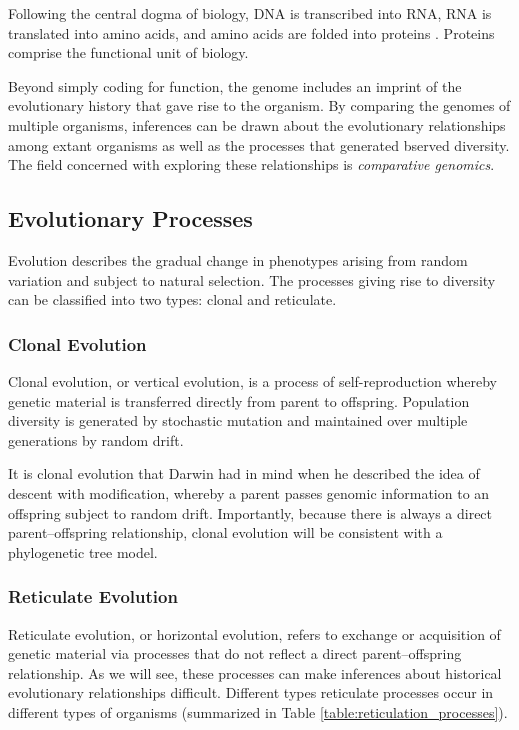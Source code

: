 Following the central dogma of biology, DNA is transcribed into RNA, RNA is translated into amino acids, and amino acids are folded into proteins \cite{Crick:1970wb}.
Proteins comprise the functional unit of biology.

Beyond simply coding for function, the genome includes an imprint of the evolutionary history that gave rise to the organism.
By comparing the genomes of multiple organisms, inferences can be drawn about the evolutionary relationships among extant organisms as well as the processes that generated bserved diversity.
The field concerned with exploring these relationships is \emph{comparative genomics}.

\subsection{Evolutionary Processes}
\label{bg:bio:evolution}

Evolution describes the gradual change in phenotypes arising from random variation and subject to natural selection.
The processes giving rise to diversity can be classified into two types: clonal and reticulate.

\subsubsection{Clonal Evolution}
\label{bg:bio:evolution:clonal}

Clonal evolution, or vertical evolution, is a process of self-reproduction whereby genetic material is transferred directly from parent to offspring.
Population diversity is generated by stochastic mutation and maintained over multiple generations by random drift.

It is clonal evolution that Darwin had in mind when he described the idea of descent with modification, whereby a parent passes genomic information to an offspring subject to random drift.
Importantly, because there is always a direct parent--offspring relationship, clonal evolution will be consistent with a phylogenetic tree model.

\subsubsection{Reticulate Evolution}
\label{bg:bio:evolution:reticulate}

Reticulate evolution, or horizontal evolution, refers to exchange or acquisition of genetic material via processes that do not reflect a direct parent--offspring relationship.
As we will see, these processes can make inferences about historical evolutionary relationships difficult.
Different types reticulate processes occur in different types of organisms (summarized in Table \ref{table:reticulation_processes}).

